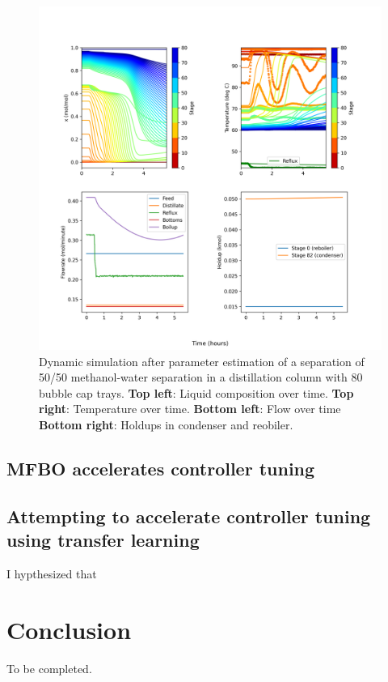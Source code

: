 \begin{figure}
    \centering
    \includegraphics[width=\textwidth]{gfx/Chapter06/2021_11_17_closed_loop_dynamic.png}
    \caption{Dynamic simulation after parameter estimation of a separation of 50/50 methanol-water separation in a distillation column with 80 bubble cap trays. \textbf{Top left}: Liquid composition over time. \textbf{Top right}: Temperature over time. \textbf{Bottom left}: Flow over time \textbf{Bottom right}: Holdups in condenser and reobiler.}
    \label{fig:dynamic_nominal}
\end{figure}


\subsection{MFBO accelerates controller tuning}





\subsection{Attempting to accelerate controller tuning using transfer learning}

I hypthesized that 




\section{Conclusion}

To be completed.